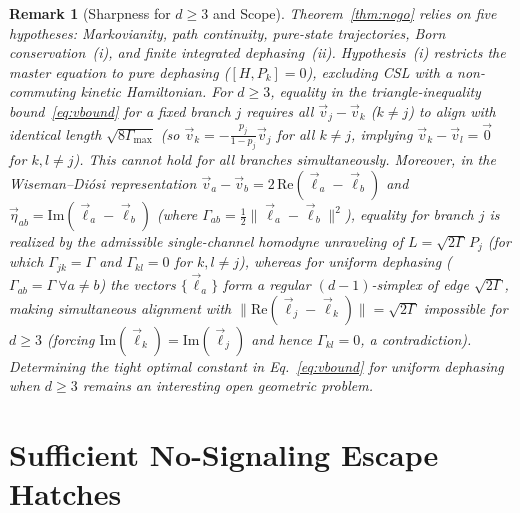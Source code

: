 \documentclass[aps,pra,10pt,twocolumn,superscriptaddress,amsmath,amssymb,floatfix]{revtex4-2}
\newtheorem{remark}{Remark}
\begin{document}
\begin{remark}[Sharpness for $d\ge 3$ and Scope]
Theorem~\ref{thm:nogo} relies on five hypotheses: Markovianity, path continuity, pure-state trajectories, Born conservation~(i), and finite integrated dephasing~(ii). Hypothesis~(i) restricts the master equation to pure dephasing ($[H,P_k]=0$), excluding CSL with a non-commuting kinetic Hamiltonian. For $d \ge 3$, equality in the triangle-inequality bound~\eqref{eq:vbound} for a fixed branch $j$ requires all $\vec{v}_j - \vec{v}_k$ ($k \ne j$) to align with identical length $\sqrt{8\Gamma_{\max}}$ (so $\vec{v}_k = -\frac{p_j}{1-p_j}\vec{v}_j$ for all $k\ne j$, implying $\vec{v}_k - \vec{v}_l = \vec{0}$ for $k,l\ne j$). This cannot hold for all branches simultaneously. Moreover, in the Wiseman--Di\'osi representation $\vec{v}_a - \vec{v}_b = 2\,\mathrm{Re}(\vec{\ell}_a - \vec{\ell}_b)$ and $\vec{\eta}_{ab} = \mathrm{Im}(\vec{\ell}_a - \vec{\ell}_b)$ (where $\Gamma_{ab} = \frac{1}{2}\|\vec{\ell}_a-\vec{\ell}_b\|^2$), equality for branch $j$ is realized by the admissible single-channel homodyne unraveling of $L = \sqrt{2\Gamma}\,P_j$ (for which $\Gamma_{jk}=\Gamma$ and $\Gamma_{kl}=0$ for $k,l\ne j$), whereas for \emph{uniform} dephasing ($\Gamma_{ab}=\Gamma\ \forall a\ne b$) the vectors $\{\vec{\ell}_a\}$ form a regular $(d-1)$-simplex of edge $\sqrt{2\Gamma}$, making simultaneous alignment with $\|\mathrm{Re}(\vec{\ell}_j-\vec{\ell}_k)\|=\sqrt{2\Gamma}$ impossible for $d \ge 3$ (forcing $\mathrm{Im}(\vec{\ell}_k)=\mathrm{Im}(\vec{\ell}_j)$ and hence $\Gamma_{kl}=0$, a contradiction). Determining the tight optimal constant in Eq.~\eqref{eq:vbound} for uniform dephasing when $d \ge 3$ remains an interesting open geometric problem.
\end{remark}

\section{Sufficient No-Signaling Escape Hatches}
\label{sec:exits}
\end{document}

